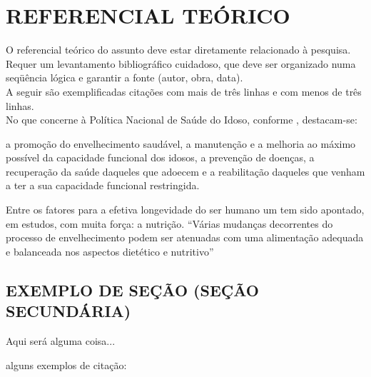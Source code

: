 \chapter{REFERENCIAL TEÓRICO}
\label{chap:referencial_teorico}

O referencial teórico do assunto deve estar diretamente relacionado à pesquisa.
Requer um levantamento bibliográfico cuidadoso, que deve ser organizado numa seqüência lógica e garantir a fonte (autor, obra, data).\\
A seguir são exemplificadas citações com mais de três linhas e com menos de três
linhas.\\

No que concerne à Política Nacional de Saúde do Idoso, conforme  , destacam-se:
\begin{citacao}
a promoção do envelhecimento saudável, a manutenção e a melhoria ao máximo
possível da capacidade funcional dos idosos, a prevenção de doenças, a recuperação
da saúde daqueles que adoecem e a reabilitação daqueles que venham a ter a sua
capacidade funcional restringida.
\end{citacao}
Entre os fatores para a efetiva longevidade do ser humano um tem sido apontado, em
estudos, com muita força: a nutrição. “Várias mudanças decorrentes do processo de
envelhecimento podem ser atenuadas com uma alimentação adequada e balanceada nos
aspectos dietético e nutritivo” \cite[p.31]{salgado2002nutriccao}\\

\section{ EXEMPLO DE SEÇÃO (SEÇÃO SECUNDÁRIA) }
Aqui será alguma coisa...

\label{sec:issoeumasubsecao}

alguns exemplos de citação:\\
\cite{berquo1980fatores}\\
\cite{santos1980dinamica}\\
\cite{NBR6023:2002}\\
\cite{NBR14724:2005}\\
\cite{NBR10520:2002}\\
\cite{lessa2004manual}\\
\cite{rey2000planejar}\\
\cite{rajagopalan2003identidade}\\
\cite{flemming1999calculo}\\
\cite{gonccalves2}\\
\cite{salgado2002nutriccao}